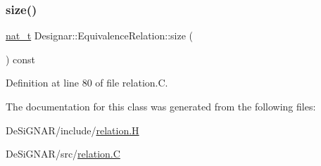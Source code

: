\subsubsection{\texorpdfstring{size()}{size()}}
{\footnotesize\ttfamily \hyperlink{namespace_designar_aa72662848b9f4815e7bf31a7cf3e33d1}{nat\+\_\+t} Designar\+::\+Equivalence\+Relation\+::size (\begin{DoxyParamCaption}{ }\end{DoxyParamCaption}) const}



Definition at line 80 of file relation.\+C.



The documentation for this class was generated from the following files\+:\begin{DoxyCompactItemize}
\item 
De\+Si\+G\+N\+A\+R/include/\hyperlink{relation_8_h}{relation.\+H}\item 
De\+Si\+G\+N\+A\+R/src/\hyperlink{relation_8_c}{relation.\+C}\end{DoxyCompactItemize}
